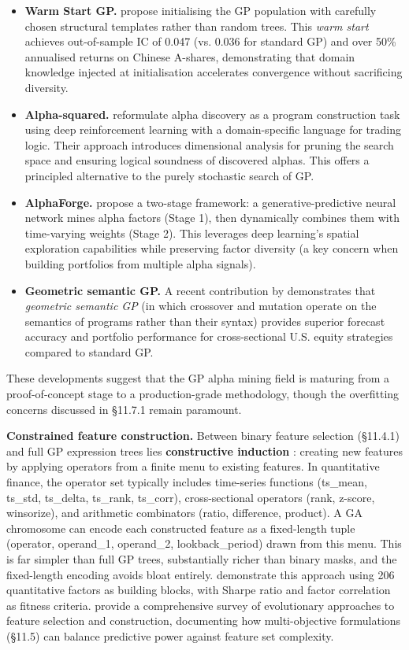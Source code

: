\begin{itemize}
\item \textbf{Warm Start GP.} \cite{Ren2024} propose initialising the GP population with carefully chosen structural templates rather than random trees. This \textit{warm start} achieves out-of-sample IC of 0.047 (vs. 0.036 for standard GP) and over 50\% annualised returns on Chinese A-shares, demonstrating that domain knowledge injected at initialisation accelerates convergence without sacrificing diversity.
\item \textbf{Alpha-squared.} \cite{Xu2024} reformulate alpha discovery as a program construction task using deep reinforcement learning with a domain-specific language for trading logic. Their approach introduces dimensional analysis for pruning the search space and ensuring logical soundness of discovered alphas. This offers a principled alternative to the purely stochastic search of GP.
\item \textbf{AlphaForge.} \cite{Shi2025} propose a two-stage framework: a generative-predictive neural network mines alpha factors (Stage 1), then dynamically combines them with time-varying weights (Stage 2). This leverages deep learning's spatial exploration capabilities while preserving factor diversity (a key concern when building portfolios from multiple alpha signals).
\item \textbf{Geometric semantic GP.} A recent contribution by \cite{Bunjerdtaweeporn2025} demonstrates that \textit{geometric semantic GP} (in which crossover and mutation operate on the semantics of programs rather than their syntax) provides superior forecast accuracy and portfolio performance for cross-sectional U.S. equity strategies compared to standard GP.
\end{itemize}

These developments suggest that the GP alpha mining field is maturing from a proof-of-concept stage to a production-grade methodology, though the overfitting concerns discussed in §11.7.1 remain paramount.

\textbf{Constrained feature construction.} Between binary feature selection (§11.4.1) and full GP expression trees lies \textbf{constructive induction} \citep{Krawiec2002}: creating new features by applying operators from a finite menu to existing features. In quantitative finance, the operator set typically includes time-series functions (ts\_mean, ts\_std, ts\_delta, ts\_rank, ts\_corr), cross-sectional operators (rank, z-score, winsorize), and arithmetic combinators (ratio, difference, product). A GA chromosome can encode each constructed feature as a fixed-length tuple (operator, operand\_1, operand\_2, lookback\_period) drawn from this menu. This is far simpler than full GP trees, substantially richer than binary masks, and the fixed-length encoding avoids bloat entirely. \cite{Su2022} demonstrate this approach using 206 quantitative factors as building blocks, with Sharpe ratio and factor correlation as fitness criteria. \cite{Xue2016} provide a comprehensive survey of evolutionary approaches to feature selection and construction, documenting how multi-objective formulations (§11.5) can balance predictive power against feature set complexity.

